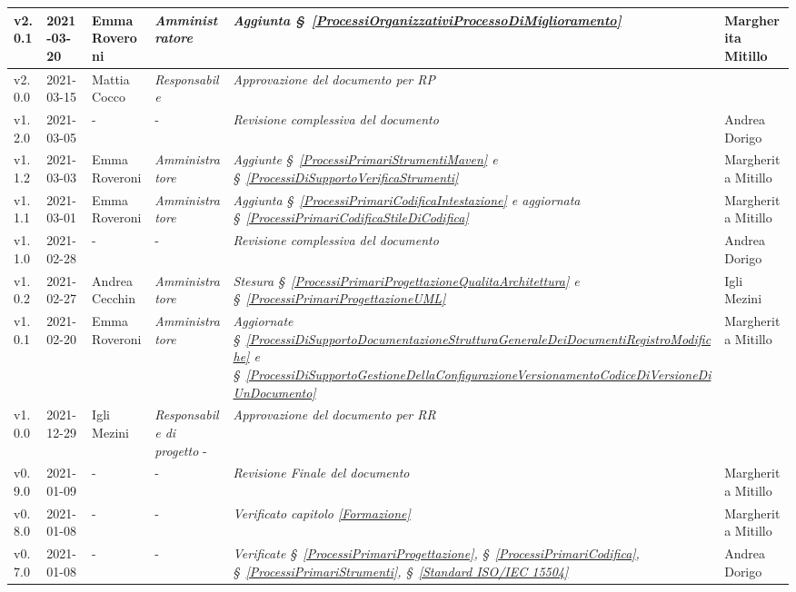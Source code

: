 {\begin{center}
\begin{longtable}[c]{|p{2cm-1\tabcolsep}|p{2cm}|p{3cm-2\tabcolsep}|p{3cm-1.5\tabcolsep}|p{}|p{3cm-2\tabcolsep}|}
		\hline
		\centering v2.0.1 & 2021-03-20 & Emma Roveroni & \centering \textit{Amministratore}  & \textit{Aggiunta \S~\ref{ProcessiOrganizzativiProcessoDiMiglioramento} } & Margherita Mitillo \\
		\hline
		\centering v2.0.0 & 2021-03-15 & Mattia Cocco & \centering \textit{Responsabile}  & \textit{Approvazione del documento per RP} & \makecell[c] {-} \\
		\hline
		\centering v1.2.0 & 2021-03-05 & \centering - & \centering - & \textit{Revisione complessiva del documento} & Andrea Dorigo  \\
		\hline
		\centering v1.1.2 & 2021-03-03 & Emma Roveroni & \centering \textit{Amministratore}  & \textit{Aggiunte \S~\ref{ProcessiPrimariStrumentiMaven} e \S~\ref{ProcessiDiSupportoVerificaStrumenti} } & Margherita Mitillo \\
		\hline
		\centering v1.1.1 & 2021-03-01 & Emma Roveroni & \centering \textit{Amministratore} & \textit{Aggiunta  \S~\ref{ProcessiPrimariCodificaIntestazione} e aggiornata  \S~\ref{ProcessiPrimariCodificaStileDiCodifica} } & Margherita Mitillo  \\
		\hline
		\centering v1.1.0 & 2021-02-28 & \centering - & \centering - & \textit{Revisione complessiva del documento}   & Andrea Dorigo \\
		\hline
		\centering v1.0.2 & 2021-02-27 & Andrea Cecchin & \centering \textit{Amministratore}  & \textit{Stesura  \S~\ref{ProcessiPrimariProgettazioneQualitaArchitettura} e \S~\ref{ProcessiPrimariProgettazioneUML}} & Igli Mezini \\
		\hline
		\centering v1.0.1 & 2021-02-20 & Emma Roveroni & \centering \textit{Amministratore}  & \textit{Aggiornate  \S~\ref{ProcessiDiSupportoDocumentazioneStrutturaGeneraleDeiDocumentiRegistroModifiche} e \S~\ref{ProcessiDiSupportoGestioneDellaConfigurazioneVersionamentoCodiceDiVersioneDiUnDocumento}} & Margherita Mitillo \\
		\hline
		\centering v1.0.0 & 2021-12-29 & Igli Mezini & \centering \textit{Responsabile di progetto}  - & \textit{Approvazione del documento per RR} & \makecell[c]{-} \\
		\hline
		\centering v0.9.0 & 2021-01-09 & \centering - & \centering -  & \textit{Revisione Finale del documento} & Margherita Mitillo\\
		\hline
		\centering v0.8.0 & 2021-01-08 & \centering - & \centering -  & \textit{Verificato capitolo \ref{Formazione}} & Margherita Mitillo \\
		\hline
		\centering v0.7.0 & 2021-01-08 & \centering - & \centering -  & \textit{Verificate  \S~\ref{ProcessiPrimariProgettazione}, \S~\ref{ProcessiPrimariCodifica}, \S~\ref{ProcessiPrimariStrumenti}, \S~\ref{Standard ISO/IEC 15504} } & Andrea Dorigo \\

\end{longtable}
\end{center}}
